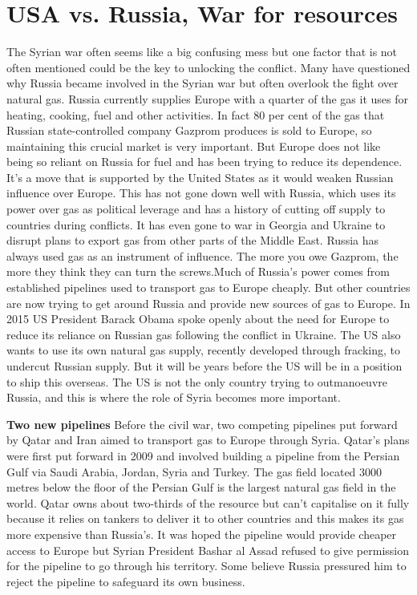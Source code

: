 \section{USA vs. Russia, War for resources}
The Syrian war often seems like a big confusing mess but one factor that is not often mentioned could be the key to unlocking the conflict.
Many have questioned why Russia became involved in the Syrian war but often overlook the fight over natural gas.
Russia currently supplies Europe with a quarter of the gas it uses for heating, cooking, fuel and other activities.
In fact 80 per cent of the gas that Russian state-controlled company Gazprom produces is sold to Europe, so maintaining this crucial market is very important.
But Europe does not like being so reliant on Russia for fuel and has been trying to reduce its dependence. It’s a move that is supported by the United States as it would weaken Russian influence over Europe.
This has not gone down well with Russia, which uses its power over gas as political leverage and has a history of cutting off supply to countries during conflicts. It has even gone to war in Georgia and Ukraine to disrupt plans to export gas from other parts of the Middle East.
Russia has always used gas as an instrument of influence. The more you owe Gazprom, the more they think they can turn the screws.Much of Russia’s power comes from established pipelines used to transport gas to Europe cheaply. But other countries are now trying to get around Russia and provide new sources of gas to Europe.
In 2015 US President Barack Obama spoke openly about the need for Europe to reduce its reliance on Russian gas following the conflict in Ukraine.
The US also wants to use its own natural gas supply, recently developed through fracking, to undercut Russian supply. But it will be years before the US will be in a position to ship this overseas.
The US is not the only country trying to outmanoeuvre Russia, and this is where the role of Syria becomes more important.

\textbf{Two new pipelines} \newline
Before the civil war, two competing pipelines put forward by Qatar and Iran aimed to transport gas to Europe through Syria.
Qatar’s plans were first put forward in 2009 and involved building a pipeline from the Persian Gulf via Saudi Arabia, Jordan, Syria and Turkey.
The gas field located 3000 metres below the floor of the Persian Gulf is the largest natural gas field in the world. Qatar owns about two-thirds of the resource but can’t capitalise on it fully because it relies on tankers to deliver it to other countries and this makes its gas more expensive than Russia’s.
It was hoped the pipeline would provide cheaper access to Europe but Syrian President Bashar al Assad refused to give permission for the pipeline to go through his territory. Some believe Russia pressured him to reject the pipeline to safeguard its own business.


